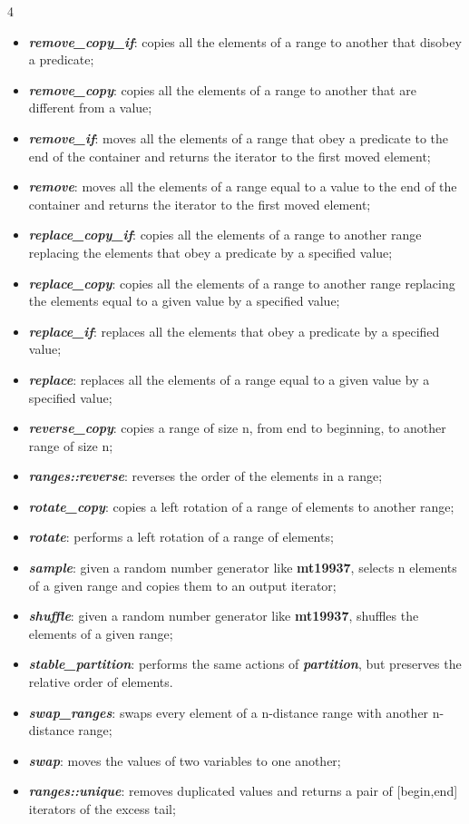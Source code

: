 \documentclass[10pt]{article}
\begin{document}
\begin{multicols*}{4}
{\begin{itemize}[leftmargin=*,topsep=0.25pt]
	\item  \emph{\textbf{remove\_copy\_if}}: copies all the elements of a range to another that disobey a predicate; 
	\item  \emph{\textbf{remove\_copy}}: copies all the elements of a range to another that are different from a value;
	\item  \emph{\textbf{remove\_if}}: moves all the elements of a range that obey a predicate to the end of the container and returns the iterator to the first moved element; 
	\item  \emph{\textbf{remove}}: moves all the elements of a range equal to a value to the end of the container and returns the iterator to the first moved element;
	\item  \emph{\textbf{replace\_copy\_if}}: copies all the elements of a range to another range replacing the elements that obey a predicate by a specified value;
	\item  \emph{\textbf{replace\_copy}}: copies all the elements of a range to another range replacing the elements equal to a given value by a specified value;
	\item  \emph{\textbf{replace\_if}}: replaces all the elements that obey a predicate by a specified value;
	\item  \emph{\textbf{replace}}: replaces all the elements of a range equal to a given value by a specified value;
	\item  \emph{\textbf{reverse\_copy}}: copies a range of size n, from end to beginning, to another range of size n;
  \item  \emph{\textbf{ranges::reverse}}: reverses the order of the elements in a range;
	\item  \emph{\textbf{rotate\_copy}}: copies a left rotation of a range of elements to another range;
	\item  \emph{\textbf{rotate}}: performs a left rotation of a range of elements;
	\item  \emph{\textbf{sample}}: given a random number generator like {\textbf{mt19937}}, selects n elements of a given range and copies them to an output iterator;
	\item  \emph{\textbf{shuffle}}: given a random number generator like {\textbf{mt19937}}, shuffles the elements of a given range;
	\item  \emph{\textbf{stable\_partition}}: performs the same actions of  \emph{\textbf{partition}}, but preserves the relative order of elements. 
	\item  \emph{\textbf{swap\_ranges}}: swaps every element of a n-distance range with another n-distance range;
	\item  \emph{\textbf{swap}}: moves the values of two variables to one another;
	\item  \emph{\textbf{ranges::unique}}: removes duplicated values and returns a pair of [begin,end] iterators of the excess tail;
	


\end{itemize}}
\end{multicols*}
\end{document}
